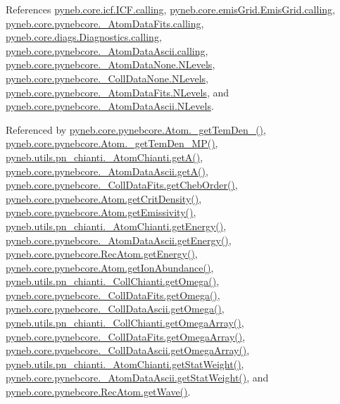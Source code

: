 References \hyperlink{icf_8py_source_l00016}{pyneb.\+core.\+icf.\+I\+C\+F.\+calling}, \hyperlink{emis_grid_8py_source_l00041}{pyneb.\+core.\+emis\+Grid.\+Emis\+Grid.\+calling}, \hyperlink{pynebcore_8py_source_l00090}{pyneb.\+core.\+pynebcore.\+\_\+\+Atom\+Data\+Fits.\+calling}, \hyperlink{diags_8py_source_l00169}{pyneb.\+core.\+diags.\+Diagnostics.\+calling}, \hyperlink{pynebcore_8py_source_l00311}{pyneb.\+core.\+pynebcore.\+\_\+\+Atom\+Data\+Ascii.\+calling}, \hyperlink{pynebcore_8py_source_l00062}{pyneb.\+core.\+pynebcore.\+\_\+\+Atom\+Data\+None.\+N\+Levels}, \hyperlink{pynebcore_8py_source_l00075}{pyneb.\+core.\+pynebcore.\+\_\+\+Coll\+Data\+None.\+N\+Levels}, \hyperlink{pynebcore_8py_source_l00155}{pyneb.\+core.\+pynebcore.\+\_\+\+Atom\+Data\+Fits.\+N\+Levels}, and \hyperlink{pynebcore_8py_source_l00404}{pyneb.\+core.\+pynebcore.\+\_\+\+Atom\+Data\+Ascii.\+N\+Levels}.



Referenced by \hyperlink{pynebcore_8py_source_l01803}{pyneb.\+core.\+pynebcore.\+Atom.\+\_\+get\+Tem\+Den\+\_()}, \hyperlink{pynebcore_8py_source_l01980}{pyneb.\+core.\+pynebcore.\+Atom.\+\_\+get\+Tem\+Den\+\_\+\+M\+P()}, \hyperlink{pn__chianti_8py_source_l00296}{pyneb.\+utils.\+pn\+\_\+chianti.\+\_\+\+Atom\+Chianti.\+get\+A()}, \hyperlink{pynebcore_8py_source_l00475}{pyneb.\+core.\+pynebcore.\+\_\+\+Atom\+Data\+Ascii.\+get\+A()}, \hyperlink{pynebcore_8py_source_l00694}{pyneb.\+core.\+pynebcore.\+\_\+\+Coll\+Data\+Fits.\+get\+Cheb\+Order()}, \hyperlink{pynebcore_8py_source_l01693}{pyneb.\+core.\+pynebcore.\+Atom.\+get\+Crit\+Density()}, \hyperlink{pynebcore_8py_source_l01716}{pyneb.\+core.\+pynebcore.\+Atom.\+get\+Emissivity()}, \hyperlink{pn__chianti_8py_source_l00346}{pyneb.\+utils.\+pn\+\_\+chianti.\+\_\+\+Atom\+Chianti.\+get\+Energy()}, \hyperlink{pynebcore_8py_source_l00525}{pyneb.\+core.\+pynebcore.\+\_\+\+Atom\+Data\+Ascii.\+get\+Energy()}, \hyperlink{pynebcore_8py_source_l02811}{pyneb.\+core.\+pynebcore.\+Rec\+Atom.\+get\+Energy()}, \hyperlink{pynebcore_8py_source_l02110}{pyneb.\+core.\+pynebcore.\+Atom.\+get\+Ion\+Abundance()}, \hyperlink{pn__chianti_8py_source_l00484}{pyneb.\+utils.\+pn\+\_\+chianti.\+\_\+\+Coll\+Chianti.\+get\+Omega()}, \hyperlink{pynebcore_8py_source_l00811}{pyneb.\+core.\+pynebcore.\+\_\+\+Coll\+Data\+Fits.\+get\+Omega()}, \hyperlink{pynebcore_8py_source_l01063}{pyneb.\+core.\+pynebcore.\+\_\+\+Coll\+Data\+Ascii.\+get\+Omega()}, \hyperlink{pn__chianti_8py_source_l00461}{pyneb.\+utils.\+pn\+\_\+chianti.\+\_\+\+Coll\+Chianti.\+get\+Omega\+Array()}, \hyperlink{pynebcore_8py_source_l00783}{pyneb.\+core.\+pynebcore.\+\_\+\+Coll\+Data\+Fits.\+get\+Omega\+Array()}, \hyperlink{pynebcore_8py_source_l01039}{pyneb.\+core.\+pynebcore.\+\_\+\+Coll\+Data\+Ascii.\+get\+Omega\+Array()}, \hyperlink{pn__chianti_8py_source_l00323}{pyneb.\+utils.\+pn\+\_\+chianti.\+\_\+\+Atom\+Chianti.\+get\+Stat\+Weight()}, \hyperlink{pynebcore_8py_source_l00502}{pyneb.\+core.\+pynebcore.\+\_\+\+Atom\+Data\+Ascii.\+get\+Stat\+Weight()}, and \hyperlink{pynebcore_8py_source_l02623}{pyneb.\+core.\+pynebcore.\+Rec\+Atom.\+get\+Wave()}.


